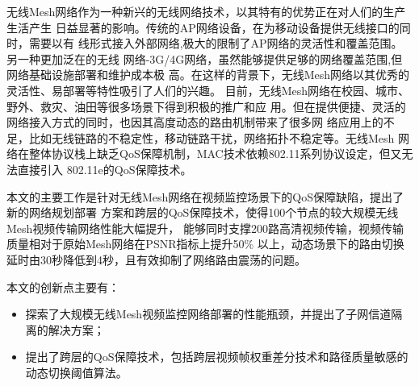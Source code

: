 \begin{cabstract}
  无线Mesh网络作为一种新兴的无线网络技术，以其特有的优势正在对人们的生产生活产生
  日益显著的影响。传统的AP网络设备，在为移动设备提供无线接口的同时，需要以有
  线形式接入外部网络,极大的限制了AP网络的灵活性和覆盖范围。另一种更加泛在的无线
  网络-3G/4G网络，虽然能够提供足够的网络覆盖范围,但网络基础设施部署和维护成本极
  高。在这样的背景下，无线Mesh网络以其优秀的灵活性、易部署等特性吸引了人们的兴趣。
  目前，无线Mesh网络在校园、城市、野外、救灾、油田等很多场景下得到积极的推广和应
  用。但在提供便捷、灵活的网络接入方式的同时，也因其高度动态的路由机制带来了很多网
  络应用上的不足，比如无线链路的不稳定性，移动链路干扰，网络拓扑不稳定等。无线Mesh
  网络在整体协议栈上缺乏QoS保障机制，MAC技术依赖802.11系列协议设定，但又无法直接引入
  802.11e的QoS保障技术。

  本文的主要工作是针对无线Mesh网络在视频监控场景下的QoS保障缺陷，提出了新的网络规划部署
  方案和跨层的QoS保障技术，使得100个节点的较大规模无线Mesh视频传输网络性能大幅提升，
  能够同时支撑200路高清视频传输，视频传输质量相对于原始Mesh网络在PSNR指标上提升50\%
  以上，动态场景下的路由切换延时由30秒降低到4秒，且有效抑制了网络路由震荡的问题。

  本文的创新点主要有：
  \begin{itemize}
    \item 探索了大规模无线Mesh视频监控网络部署的性能瓶颈，并提出了子网信道隔离的解决方案；
    \item 提出了跨层的QoS保障技术，包括跨层视频帧权重差分技术和路径质量敏感的动态切换阈值算法。
  \end{itemize}

\end{cabstract}


